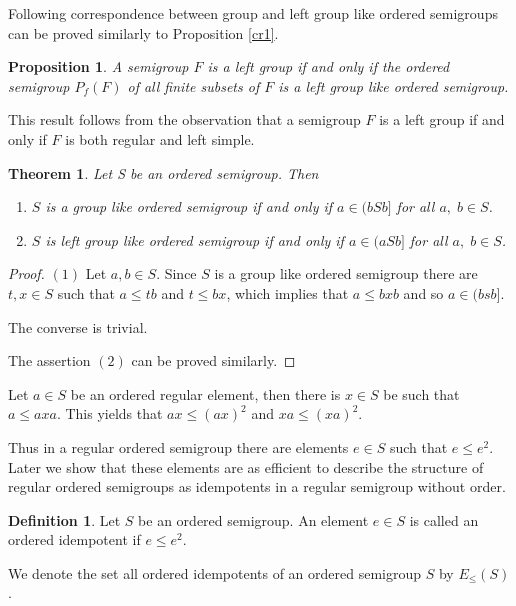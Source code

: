 \documentclass[13pt]{article}
\newtheorem{Theorem}[theorem]{Theorem}
\newtheorem{Proposition}[theorem]{Proposition}
\theoremstyle{definition}
\newtheorem{Definition}[theorem]{Definition}
\theoremstyle{remark}
\numberwithin{equation}{section}
\begin{document}
Following correspondence between   group and left group like ordered
semigroups can be proved similarly to Proposition \ref{cr1}.
\begin{Proposition}\label{cr2}
A semigroup $F$ is a left group if and only if the ordered semigroup
 $P_f(F)$ of all finite subsets of $F$ is a left group like ordered semigroup.
\end{Proposition}
This result follows from the observation that a semigroup $F$ is a
left group if and only if $F$ is both regular and left simple.
\begin{Theorem}\label{cr3}
Let S be an ordered semigroup. Then
\begin{enumerate}
  \item \vspace{-.4cm}
 $S$ is a  group like ordered semigroup if and only if $a \in (bSb]$ for all $a, \;b \in S$.
 \item \vspace{-.4cm}
$S$ is  left group like ordered semigroup if and only if $ a
\in(aSb]$ for all $a, \;b \in S$.
\end{enumerate}
\end{Theorem}
\begin{proof}
$(1)$ Let $a, b \in S$. Since  $S$ is a group like ordered semigroup
there are $t, x \in S$ such that $a \leq tb$ and $t \leq bx$, which
implies  that $a \leq bxb$ and so $a \in (bsb]$.

The converse is trivial.

The assertion $(2)$ can be proved similarly.
\end{proof}



Let $a \in S$ be an ordered regular element, then there is  $x \in
S$ be such that $a \leq axa$. This yields that  $ax \leq (ax)^2$ and
$xa \leq (xa)^2$.

Thus in a  regular ordered semigroup there are elements $e \in S$
such that $e \leq e^2$. Later we show that these elements are as
efficient  to describe the structure of  regular ordered semigroups
as idempotents in a regular semigroup without order.
\begin{Definition}
Let $S$ be an ordered semigroup. An element $e \in S$ is called an
ordered idempotent if $e \leq e^2$.
\end{Definition}
We denote the set all ordered idempotents of an ordered semigroup
$S$ by $E_\leq(S)$.
\end{document}
